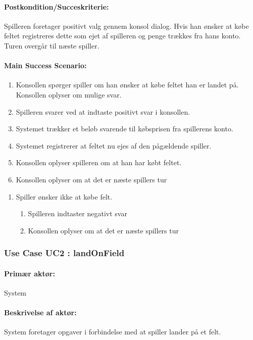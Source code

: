 \paragraph{Postkondition/Succeskriterie:}
Spilleren foretager positivt valg gennem konsol dialog. Hvis han ønsker at købe feltet registreres dette som ejet af spilleren og penge trækkes fra hans konto. Turen overgår til næste spiller.

\paragraph{Main Success Scenario:} 

\begin{enumerate}
\item Konsollen spørger spiller om han ønsker at købe feltet han er landet på. Konsollen oplyser om mulige svar.
\item Spilleren svarer ved at indtaste positivt svar i konsollen.
\item Systemet trækker et beløb svarende til købsprisen fra spillerens konto.
\item Systemet registrerer at feltet nu ejes af den pågældende spiller.
\item Konsollen oplyser spilleren om at han har købt feltet.
\item Konsollen oplyser om at det er næste spillers tur
\end{enumerate} 

\begin{enumerate}[2a]
\item Spiller ønsker ikke at købe felt.
	\begin{enumerate}[1.]
	\item Spilleren indtaster negativt svar 
	\item Konsollen oplyser om at det er næste spillers tur
	\end{enumerate}
\end{enumerate}

\subsubsection{Use Case UC2 : landOnField}\label{sec:krav:funkKrav:UC2}

\paragraph{Primær aktør:} 
System

\paragraph{Beskrivelse af aktør:} 
System foretager opgaver i forbindelse med at spiller lander på et felt.

